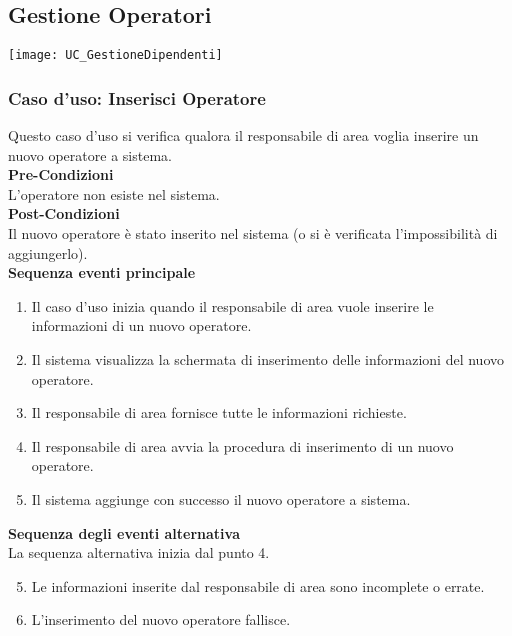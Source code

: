 \documentclass[green, fancy, 11pt]{elegantbook}
\begin{document}
\subsection{Gestione Operatori}
\texttt{[image: UC\_GestioneDipendenti]}

\subsubsection{Caso d'uso: Inserisci Operatore}
\noindent
Questo caso d’uso si verifica qualora il responsabile di area voglia inserire un nuovo operatore a sistema.\\
\textbf{Pre-Condizioni}\\
L’operatore non esiste nel sistema.\\
\textbf{Post-Condizioni}\\
Il nuovo operatore è stato inserito nel sistema (o si è verificata l’impossibilità di aggiungerlo).\\
\textbf{Sequenza eventi principale}
\begin{enumerate}
	\item Il caso d’uso inizia quando il responsabile di area vuole inserire le informazioni di un nuovo operatore.
	\item Il sistema visualizza la schermata di inserimento delle informazioni del nuovo operatore.
	\item Il responsabile di area fornisce tutte le informazioni richieste.
	\item Il responsabile di area avvia la procedura di inserimento di un nuovo operatore.
	\item Il sistema aggiunge con successo il nuovo operatore a sistema.
\end{enumerate}
\textbf{Sequenza degli eventi alternativa}\\
La sequenza alternativa inizia dal punto 4.
\begin{enumerate}
	\setcounter{enumi}{4}
	\item Le informazioni inserite dal responsabile di area sono incomplete o errate.
	\item L’inserimento del nuovo operatore fallisce.
\end{enumerate}
\newpage
\end{document}
